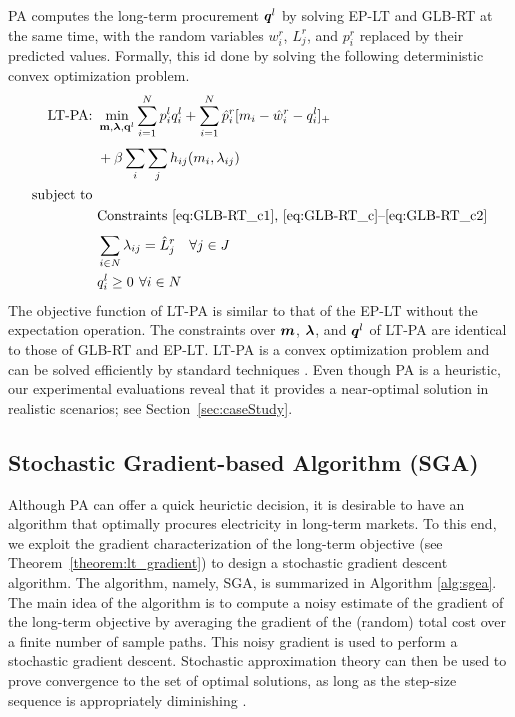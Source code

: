 PA computes the long-term procurement $\boldsymbol{q}^l$ by solving EP-LT
and GLB-RT at the same time, with the random variables $w^r_i$,
$L^r_j$, and $p^r_i$ replaced by their predicted values. Formally, this id done by solving the following deterministic convex optimization problem.
\begin{subequations}
	\begin{align*}
	\text{LT-PA: } & \min_{\mathbf{m}, \boldsymbol{\lambda}, \mathbf{q}^l} \sum_{i=1}^{N} p^l_i q^l_i + \sum_{i=1}^{N} \hat{p}^r_i [m_i - \hat{w}^r_i - q^l_i]_+ \nonumber \\
	&  + \beta  \sum_{i}^{}\sum_{j}^{}h_{ij}(m_i, \lambda_{ij}) \\
	\mbox{subject to } \nonumber \\
	&\text{Constraints \eqref{eq:GLB-RT_c1}, \eqref{eq:GLB-RT_c}--\eqref{eq:GLB-RT_c2}} \\
        &\sum_{i\in N}^{} \lambda_{ij} = \hat{L}^r_j \quad \forall j \in J \\
	&q^l_i \geq 0 \textbf{   } \forall i \in N
	\end{align*}
\end{subequations}
The objective function of LT-PA is similar to that of the EP-LT
without the expectation operation. The constraints over $\boldsymbol{m}$,
$\boldsymbol{\lambda}$, and $\boldsymbol{q}^l$ of LT-PA are identical to those
of GLB-RT and EP-LT. LT-PA is a convex
optimization problem and can be solved efficiently by standard
techniques \cite{boyd2004convex}. 
Even though PA is a heuristic, our experimental evaluations reveal
that it provides a near-optimal solution in realistic scenarios; see
Section~\ref{sec:caseStudy}.



\subsection{Stochastic Gradient-based Algorithm (SGA)}

Although PA can offer a quick heurictic decision, it is desirable to
have an algorithm that optimally procures electricity in long-term
markets. To this end, we exploit the gradient characterization of the
long-term objective (see Theorem~\ref{theorem:lt_gradient}) to design
a stochastic gradient descent algorithm. The algorithm, namely, SGA,
is summarized in Algorithm \ref{alg:sgea}. The main idea of the
algorithm is to compute a noisy estimate of the gradient of the
long-term objective by averaging the gradient of the (random) total
cost over a finite number of sample paths.
This noisy gradient is used to perform a stochastic gradient
descent. Stochastic approximation theory can then be used to prove
convergence to the set of optimal solutions, as long as the step-size
sequence is appropriately diminishing \cite{Kushner03}.

